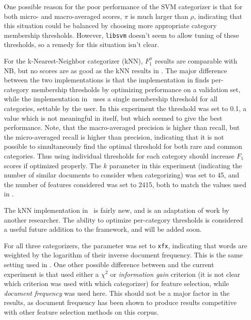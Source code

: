 One possible reason for the poor performance of the SVM categorizer is
that for both micro- and macro-averaged scores, $\pi$ is much larger
than $\rho$, indicating that this situation could be balanced by
choosing more appropriate category membership thresholds.  However,
\texttt{libsvm} doesn't seem to allow tuning of these thresholds, so a
remedy for this situation isn't clear.

For the k-Nearest-Neighbor categorizer (kNN), $F_1^\mu$ results are comparable
with NB, but no scores are as good as the kNN results in \cite{yang:99}.
The major difference between the two implementations is that the
implementation in \cite{yang:99} finds per-category membership
thresholds by optimizing performance on a validation set, while the
implementation in \aicat\ uses a single membership threshold for all
categories, settable by the user.  In this experiment the threshold
was set to 0.1, a value which is not meaningful in itself, but which
seemed to give the best performance.  Note, that the macro-averaged
precision is higher than recall, but the micro-averaged recall is
higher than precision, indicating that it is not possible to
simultaneously find the optimal threshold for both rare and common
categories.  Thus using individual thresholds for each category should
increase $F_1$ scores if optimized properly.  The $k$ parameter
in this experiment
(indicating the number of similar documents to consider when
categorizing) was set to 45, and the number of features considered was
set to 2415, both to match the values used in \cite{yang:99}.

The kNN implementation in \aicat\ is fairly new, and is an adaptation
of work by another researcher.  The ability to optimize per-category
thresholds is considered a useful future addition to the framework,
and will be added soon.

For all three categorizers, the  parameter was set to
\texttt{xfx}, indicating that words are weighted by the logarithm of
their inverse document frequency.  This is the same setting used in
\cite{yang:99}.  One other possible difference between \cite{yang:99}
and the current experiment is that \cite{yang:99} used either a
$\chi^2$ or \emph{information gain} criterion (it is not clear which
criterion was used with which categorizer) for feature selection,
while \emph{document frequency} was used here.  This should not be a
major factor in the results, as document frequency has been shown to
produce results competitive with other feature selection methods on
this corpus. \cite{yang:97}



